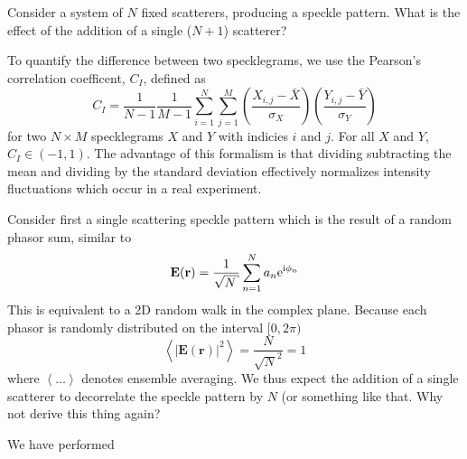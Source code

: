 Consider a system of $N$ fixed scatterers, producing a speckle pattern.
What is the effect of the addition of a single ($N+1$) scatterer?

To quantify the difference between two specklegrams, we use the Pearson's
correlation coefficent, $C_I$, defined as 
\begin{equation}
C_I = \frac{1}{N-1} \frac{1}{M-1} 
\sum_{i=1}^N \sum_{j=1}^M 
\left(\frac{X_{i,j} - \bar{X}}{\sigma_X}\right)
\left(\frac{Y_{i,j} - \bar{Y}}{\sigma_Y}\right)
\end{equation}
for two $N \times M$ specklegrams $X$ and $Y$ with indicies $i$ and $j$.
For all $X$ and $Y$, $C_I \in (-1,1)$.
The advantage of this formalism is that dividing subtracting the mean and
dividing by the standard deviation effectively normalizes intensity
fluctuations which occur in a real experiment.

Consider first a single scattering speckle pattern which is the result of a
random phasor sum, similar to 
\begin{equation}
\mathbf{E}(\mathbf{r}) = \frac{1}{\sqrt{N}} \sum_{n=1}^{N} a_n \me^{\mi \phi_n}
\end{equation}
This is equivalent to a 2D random walk in the complex plane.  Because each
phasor is randomly distributed on the interval $[0,2\pi)$
\begin{equation}
								\left<|\mathbf{E}(\mathbf{r})|^2\right> = \frac{N}{\sqrt{N}^2} = 1
\end{equation}
where $\left<\ldots\right>$ denotes ensemble averaging.  We thus expect the
addition of a single scatterer to decorrelate the speckle pattern by $N$
(or something like that.  Why not derive this thing again?

We have performed 
